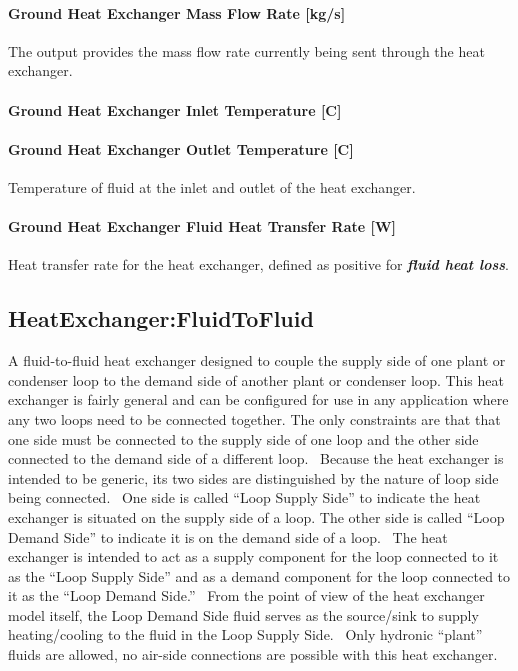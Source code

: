 \paragraph{Ground Heat Exchanger Mass Flow Rate {[}kg/s{]}}\label{ground-heat-exchanger-mass-flow-rate-kgs-3}

The output provides the mass flow rate currently being sent through the heat exchanger.

\paragraph{Ground Heat Exchanger Inlet Temperature {[}C{]}}\label{ground-heat-exchanger-inlet-temperature-c-3}

\paragraph{Ground Heat Exchanger Outlet Temperature {[}C{]}}\label{ground-heat-exchanger-outlet-temperature-c-3}

Temperature of fluid at the inlet and outlet of the heat exchanger.

\paragraph{Ground Heat Exchanger Fluid Heat Transfer Rate {[}W{]}}\label{ground-heat-exchanger-fluid-heat-transfer-rate-w}

Heat transfer rate for the heat exchanger, defined as positive for \textbf{\emph{fluid heat loss}}.

\subsection{HeatExchanger:FluidToFluid}\label{heatexchangerfluidtofluid}

A fluid-to-fluid heat exchanger designed to couple the supply side of one plant or condenser loop to the demand side of another plant or condenser loop. This heat exchanger is fairly general and can be configured for use in any application where any two loops need to be connected together. The only constraints are that that one side must be connected to the supply side of one loop and the other side connected to the demand side of a different loop.~ Because the heat exchanger is intended to be generic, its two sides are distinguished by the nature of loop side being connected.~ One side is called ``Loop Supply Side'' to indicate the heat exchanger is situated on the supply side of a loop. The other side is called ``Loop Demand Side'' to indicate it is on the demand side of a loop.~ The heat exchanger is intended to act as a supply component for the loop connected to it as the ``Loop Supply Side'' and as a demand component for the loop connected to it as the ``Loop Demand Side.''~ From the point of view of the heat exchanger model itself, the Loop Demand Side fluid serves as the source/sink to supply heating/cooling to the fluid in the Loop Supply Side.~ Only hydronic ``plant'' fluids are allowed, no air-side connections are possible with this heat exchanger.

